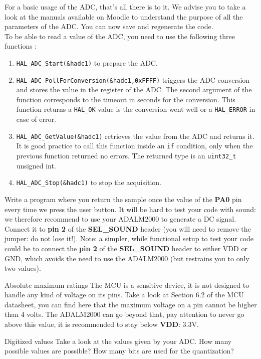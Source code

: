 For a basic usage of the ADC, that's all there is to it. We advise you to take a look at the manuals available on Moodle to understand the purpose of all the parameters of the ADC. You can now save and regenerate the code.\\

\noindent To be able to read a value of the ADC, you need to use the following three functions :
\begin{enumerate}
    \item \texttt{HAL\_ADC\_Start(\&hadc1)} to prepare the ADC.
    \item \texttt{HAL\_ADC\_PollForConversion(\&hadc1,0xFFFF)} triggers the ADC conversion and stores the value in the register of the ADC. The second argument of the function corresponds to the timeout in seconds for the conversion. This function returns a \texttt{HAL\_OK} value is the conversion went well or a \texttt{HAL\_ERROR} in case of error.
    \item \texttt{HAL\_ADC\_GetValue(\&hadc1)} retrieves the value from the ADC and returns it. It is good practice to call this function inside an \texttt{if} condition, only when the previous function returned no errors. The returned type is an \texttt{uint32\_t} unsigned int.
    \item \texttt{HAL\_ADC\_Stop(\&hadc1)} to stop the acquisition.
 \end{enumerate}

\noindent Write a program where you return the sample once the value of the \textbf{PA0} pin every time we press the user button. It will be hard to test your code with sound: we therefore recommend to use your ADALM2000 to generate a DC signal. Connect it to \textbf{pin 2} of the \textbf{SEL\_SOUND} header (you will need to remove the jumper: do not lose it!). Note: a simpler, while functional setup to test your code could be to connect the \textbf{pin 2} of the \textbf{SEL\_SOUND} header to either VDD or GND, which avoids the need to use the ADALM2000 (but restrains you to only two values). \\
\begin{bclogo}[couleur = gray!20, arrondi = 0.2, logo=\bcattention]{Absolute maximum ratings}
The MCU is a sensitive device, it is not designed to handle any kind of voltage on its pins. Take a look at Section 6.2 of the MCU datasheet, you can find here that the maximum voltage on a pin cannot be higher than 4 volts. The ADALM2000 can go beyond that, pay attention to never go above this value, it is recommended to stay below \textbf{VDD}: 3.3V.
\end{bclogo}
\begin{bclogo}[couleur = gray!20, arrondi = 0.2, logo=\bcquestion]{Digitized values}
Take a look at the values given by your ADC. How many possible values are possible? How many bits are used for the quantization?
\end{bclogo}


